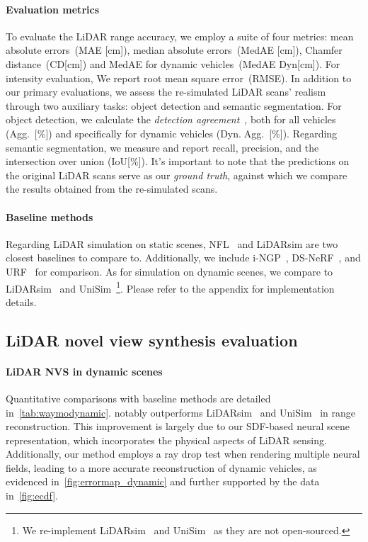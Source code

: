 \paragraph{Evaluation metrics}\label{sec:metrics}
To evaluate the LiDAR range accuracy, we employ a suite of four metrics: mean absolute errors~(MAE [cm]), median absolute errors~(MedAE [cm]), Chamfer distance~(CD[cm]) and MedAE for dynamic vehicles~(MedAE Dyn[cm]). For intensity evaluation, We report root mean square error~(RMSE).
%
In addition to our primary evaluations, we assess the re-simulated LiDAR scans' realism through two auxiliary tasks: object detection and semantic segmentation. For object detection, we calculate the \textit{detection agreement}~\cite{manivasagam2020lidarsim}, both for all vehicles (Agg.~[\%]) and specifically for dynamic vehicles (Dyn.$\;$Agg.~[\%]). Regarding semantic segmentation, we measure and report recall, precision, and the intersection over union (IoU[\%]). It's important to note that the predictions on the original LiDAR scans serve as our \textit{ground truth}, against which we compare the results obtained from the re-simulated scans.




\paragraph{Baseline methods}
Regarding LiDAR simulation on static scenes, NFL~\cite{Huang2023nfl} and LiDARsim\cite{manivasagam2020lidarsim} are two closest baselines to compare to. Additionally, we include i-NGP~\cite{mueller2022instant}, DS-NeRF~\cite{kangle2021dsnerf}, and URF~\cite{rematas2022urban} for comparison. As for simulation on dynamic scenes, we compare to LiDARsim~\cite{manivasagam2020lidarsim} and UniSim~\cite{yang2023unisim}\footnote{We re-implement LiDARsim~\cite{lee2015lidar} and UniSim~\cite{yang2023unisim} as they are not open-sourced.}. Please refer to the appendix for implementation details.






\subsection{LiDAR novel view synthesis evaluation} \label{sec:lidar_eval}
\paragraph{LiDAR NVS in dynamic scenes}
Quantitative comparisons with baseline methods are detailed in~\cref{tab:waymodynamic}. \dynfl notably outperforms LiDARsim~\cite{manivasagam2020lidarsim} and UniSim~\cite{yang2023unisim} in range reconstruction. This improvement is largely due to our SDF-based neural scene representation, which incorporates the physical aspects of LiDAR sensing. Additionally, our method employs a ray drop test when rendering multiple neural fields, leading to a more accurate reconstruction of dynamic vehicles, as evidenced in~\cref{fig:errormap_dynamic} and further supported by the data in~\cref{fig:ecdf}.


